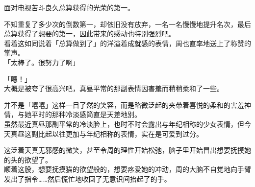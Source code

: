 面对电视苦斗良久总算获得的光荣的第一。

不知重复了多少次的倒数第一，却依旧没有放弃，一名一名慢慢地提升名次，最后总算获得了想要的第一，因此带来的感动也特别强烈吧。\\

看着这如同说着「总算做到了」的洋溢着成就感的表情，周也直率地送上了称赞的掌声。\\

「太棒了。很努力了啊」

「嗯！」\\

大概是被夸了很高兴吧，真昼平常的那副表情因害羞而稍稍柔和了一些。

并不是「嘻嘻」这样一目了然的笑容，而是略微泛起的夹带着喜悦的柔和的害羞神情，与她平时的那种冷淡感简直是天差地别。\\

虽然最近真昼那副平常的冷淡脸上，也时不时会露出与年纪相称的少女表情，但今天真昼这副比起以往更加与年纪相称的表情，实在是可爱到过分。

这泛着天真无邪感的微笑，甚至令周的理性开始松弛，脑子里开始冒出想要抚摸她的头的欲望了。\\

顺着这股，想要抚摸猫的欲望般的，想要疼爱她的冲动，周的大脑不自觉地向手臂发出了指令……然后慌忙地收回了无意识间抬起了的手。\\

